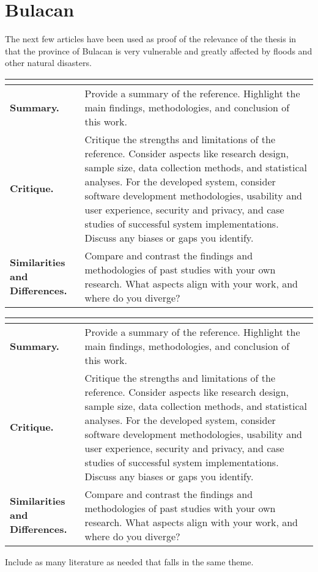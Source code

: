 \section{Bulacan}

The next few articles have been used as proof of the relevance of the thesis in that the province of Bulacan is very vulnerable and greatly affected by floods and other natural disasters.

\begin{longtable}{|L{.2\linewidth}|L{.74\linewidth}|}
	\hline
	\\ \hline
	\textbf{Summary.} & Provide a summary of the reference. Highlight the main findings, methodologies, and conclusion of this work.\\ \hline
	\textbf{Critique.} & Critique the strengths and limitations of the reference. Consider aspects like research design, sample size, data collection methods, and statistical analyses. For the developed system, consider software development methodologies, usability and user experience, security and privacy, and case studies of successful system implementations. Discuss any biases or gaps you identify.\\ \hline
	\textbf{Similarities and Differences.} & Compare and contrast the findings and methodologies of past studies with your own research. What aspects align with your work, and where do you diverge?\\ \hline
\end{longtable}

\begin{longtable}{|L{.2\linewidth}|L{.74\linewidth}|}
	\hline
	\\ \hline
	\textbf{Summary.} & Provide a summary of the reference. Highlight the main findings, methodologies, and conclusion of this work.\\ \hline
	\textbf{Critique.} & Critique the strengths and limitations of the reference. Consider aspects like research design, sample size, data collection methods, and statistical analyses. For the developed system, consider software development methodologies, usability and user experience, security and privacy, and case studies of successful system implementations. Discuss any biases or gaps you identify.\\ \hline
	\textbf{Similarities and Differences.} & Compare and contrast the findings and methodologies of past studies with your own research. What aspects align with your work, and where do you diverge?\\ \hline
\end{longtable}

Include as many literature as needed that falls in the same theme.



